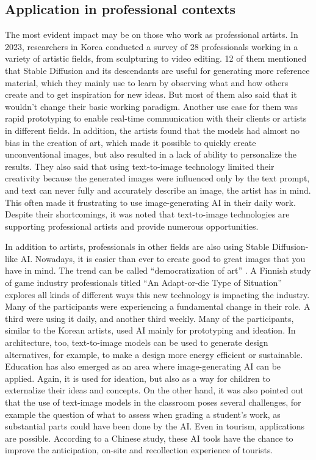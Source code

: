 \documentclass[11pt]{article}
\begin{document}
\subsection{Application in professional contexts}
The most evident impact may be on those who work as professional artists. In 2023, researchers in Korea conducted a survey of 28 professionals working in a variety of artistic fields, from sculpturing to video editing\cite{ko2023largescaletexttoimagegenartionmodelsforvisualartists}. 12 of them mentioned that Stable Diffusion and its descendants are useful for generating more reference material, which they mainly use to learn by observing what and how others create and to get inspiration for new ideas. But most of them also said that it wouldn't change their basic working paradigm. Another use case for them was rapid prototyping to enable real-time communication with their clients or artists in different fields. In addition, the artists found that the models had almost no bias in the creation of art, which made it possible to quickly create unconventional images, but also resulted in a lack of ability to personalize the results. They also said that using text-to-image technology limited their creativity because the generated images were influenced only by the text prompt, and text can never fully and accurately describe an image, the artist has in mind. This often made it frustrating to use image-generating AI in their daily work. Despite their shortcomings, it was noted that text-to-image technologies are supporting professional artists and provide numerous opportunities.

In addition to artists, professionals in other fields are also using Stable Diffusion-like AI. Nowadays, it is easier than ever to create good to great images that you have in mind. The trend can be called ``democratization of art'' \cite{democraty}. A Finnish study of game industry professionals\cite{vimpari2023texttoimagegenerationaibygameprofessionals} titled ``An Adapt-or-die Type of Situation'' explores all kinds of different ways this new technology is impacting the industry. Many of the participants were experiencing a fundamental change in their role. A third were using it daily, and another third weekly. Many of the participants, similar to the Korean artists, used AI mainly for prototyping and ideation. In architecture\cite{sekban2022artandarchtitecture}, too, text-to-image models can be used to generate design alternatives, for example, to make a design more energy efficient or sustainable. Education has also emerged as an area where image-generating AI can be applied\cite{vartiainen2023aiincraftseducation}. Again, it is used for ideation, but also as a way for children to externalize their ideas and concepts. On the other hand, it was also pointed out that the use of text-image models in the classroom poses several challenges, for example the question of what to assess when grading a student's work, as substantial parts could have been done by the AI. Even in tourism, applications are possible. According to a Chinese study\cite{miao2023aiintourism}, these AI tools have the chance to improve the anticipation, on-site and recollection experience of tourists.
\end{document}
